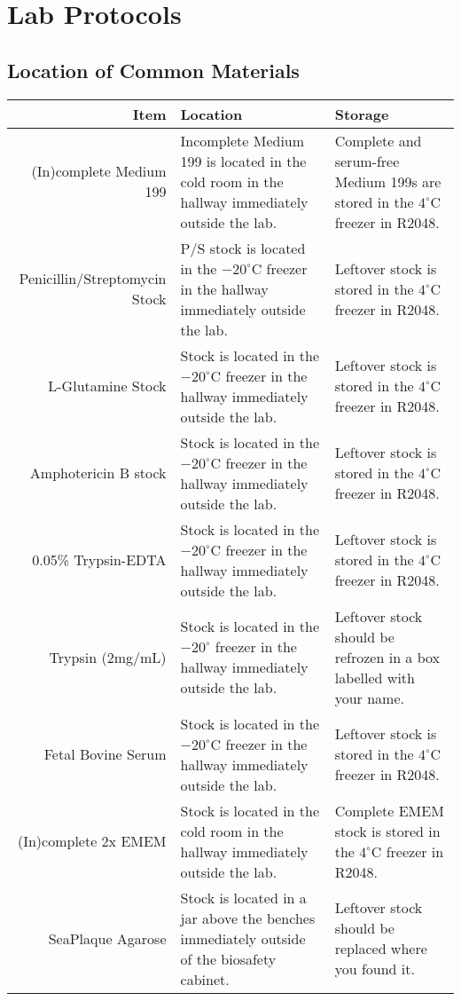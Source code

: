 
\chapter{Lab Protocols}

\section{Location of Common Materials}

\begin{tabular*}{\textwidth}{r | p{2in} p{2in}}
\hline
Item & Location & Storage \\
\hline
(In)complete Medium 199 & Incomplete Medium 199 is located in the cold room in the hallway immediately outside the lab. & Complete and serum-free Medium 199s are stored in the $4^{\circ}$C freezer in R2048.\\
Penicillin/Streptomycin Stock & P/S stock is located in the $-20^{\circ}$C freezer in the hallway immediately outside the lab. & Leftover stock is stored in the $4^{\circ}$C freezer in R2048.\\
L-Glutamine Stock & Stock is located in the $-20^{\circ}$C freezer in the hallway immediately outside the lab. & Leftover stock is stored in the $4^{\circ}$C freezer in R2048.\\
Amphotericin B stock & Stock is located in the $-20^{\circ}$C freezer in the hallway immediately outside the lab. & Leftover stock is stored in the $4^{\circ}$C freezer in R2048.\\
0.05\% Trypsin-EDTA & Stock is located in the $-20^{\circ}$C freezer in the hallway immediately outside the lab. & Leftover stock is stored in the $4^{\circ}$C freezer in R2048.\\
Trypsin ($2$mg/mL) & Stock is located in the $-20^{\circ}$ freezer in the hallway immediately outside the lab. & Leftover stock should be refrozen in a box labelled with your name.\\
Fetal Bovine Serum & Stock is located in the $-20^{\circ}$C freezer in the hallway immediately outside the lab. & Leftover stock is stored in the $4^{\circ}$C freezer in R2048.\\
(In)complete 2x EMEM & Stock is located in the cold room in the hallway immediately outside the lab. & Complete EMEM stock is stored in the $4^{\circ}$C freezer in R2048.\\
SeaPlaque Agarose & Stock is located in a jar above the benches immediately outside of the biosafety cabinet. & Leftover stock should be replaced where you found it.\\

\end{tabular*}
